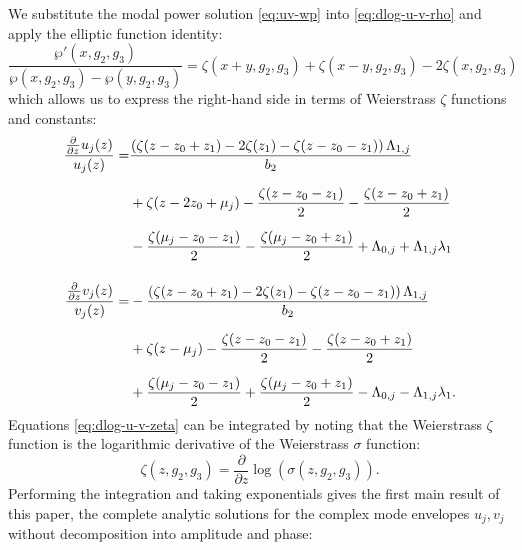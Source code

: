 \documentclass[11pt,a4paper]{article}
\numberwithin{equation}{section}
\begin{document}
We substitute the modal power solution \eqref{eq:uv-wp} into \eqref{eq:dlog-u-v-rho} and apply the elliptic function identity:
\begin{equation}
\frac{\wp'{\left(x,g_{2},g_{3} \right)}}{\wp{\left(x,g_{2},g_{3} \right)} - \wp{\left(y,g_{2},g_{3} \right)}} = \zeta{\left(x + y,g_{2},g_{3} \right)} + \zeta{\left(x - y,g_{2},g_{3} \right)} - 2 \zeta{\left(x,g_{2},g_{3} \right)}
\end{equation}
which allows us to express the right-hand side in terms of Weierstrass $\zeta$ functions and constants:
\begin{align}
\frac{\frac{\partial}{\partial z} u_j{\left(z \right)}}{u_j{\left(z \right)}} =& \frac{\left(\zeta{\left(z - z_{0} + z_{1} \right)} - 2 \zeta{\left(z_{1} \right)} - \zeta{\left(z - z_{0} - z_{1} \right)}\right) {\Lambda}_{1,j}}{b_2} \nonumber \\[6pt]
& + \zeta{\left(z - 2 z_{0} + {\mu}_{j} \right)} - \frac{\zeta{\left(z - z_{0} - z_{1} \right)}}{2} - \frac{\zeta{\left(z - z_{0} + z_{1} \right)}}{2} \nonumber \\[6pt]
& - \frac{\zeta{\left({\mu}_{j} - z_{0} - z_{1}\right)}}{2} - \frac{\zeta{\left({\mu}_{j} - z_{0} + z_{1}\right)}}{2} + {\Lambda}_{0,j} + {\Lambda}_{1,j} {\lambda}_{1} \notag \\[12pt]
\frac{\frac{\partial}{\partial z} v_j{\left(z \right)}}{v_j{\left(z \right)}} =& - \frac{\left(\zeta{\left(z - z_{0} + z_{1} \right)} - 2 \zeta{\left(z_{1} \right)} - \zeta{\left(z - z_{0} - z_{1} \right)}\right) {\Lambda}_{1,j}}{b_2} \nonumber \\[6pt]
& + \zeta{\left(z - {\mu}_{j} \right)} - \frac{\zeta{\left(z - z_{0} - z_{1} \right)}}{2} - \frac{\zeta{\left(z - z_{0} + z_{1} \right)}}{2} \nonumber \\[6pt]
& + \frac{\zeta{\left({\mu}_{j} - z_{0} - z_{1}\right)}}{2} + \frac{\zeta{\left({\mu}_{j} - z_{0} + z_{1} \right)}}{2} - {\Lambda}_{0,j} - {\Lambda}_{1,j} {\lambda}_{1}. \label{eq:dlog-u-v-zeta}
\end{align}
Equations \eqref{eq:dlog-u-v-zeta} can be integrated by noting that the Weierstrass $\zeta$ function is the logarithmic derivative of the Weierstrass $\sigma$ function:
\begin{equation}
\label{eq:zeta-dlog_sigma}
\zeta\left(z, g_2, g_3\right)=\frac{\partial}{\partial z} \log{\left(\sigma\left(z, g_2, g_3\right)\right)}.
\end{equation}
Performing the integration and taking exponentials gives the first main result of this paper, the complete analytic solutions for the complex mode envelopes $u_j, v_j$ without decomposition into amplitude and phase:
\end{document}
